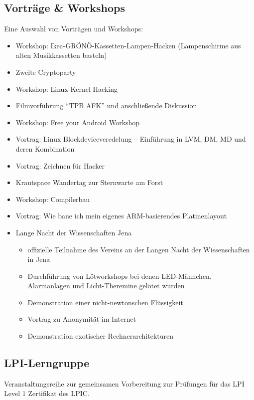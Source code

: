\documentclass[10pt, a4paper]{scrartcl}
\begin{document}
\subsection*{Vorträge \& Workshops}
Eine Auswahl von Vorträgen und Workshops:
\begin{itemize}
	\item Workshop: Ikea-GRÖNÖ-Kassetten-Lampen-Hacken (Lampenschirme aus alten Musikkassetten basteln)
	\item Zweite Cryptoparty
	\item Workshop: Linux-Kernel-Hacking
	\item Filmvorführung "`TPB AFK"' und anschließende Diskussion
	\item Workshop: Free your Android Workshop
	\item Vortrag: Linux Blockdeviceveredelung -- Einführung in LVM, DM, MD und deren Kombination
	\item Vortrag: Zeichnen für Hacker
	\item Krautspace Wandertag zur Sternwarte am Forst
	\item Workshop: Compilerbau
	\item Vortrag: Wie baue ich mein eigenes ARM-basierendes Platinenlayout
	\item Lange Nacht der Wissenschaften Jena
		\begin{itemize}
		    \item offizielle Teilnahme des Vereins an der Langen Nacht der Wissenschaften in Jena
		    \item Durchführung von Lötworkshops bei denen LED-Männchen, Alarmanlagen und Licht-Theremine gelötet wurden
		    \item Demonstration einer nicht-newtonschen Flüssigkeit
		    \item Vortrag zu Anonymität im Internet
		    \item Demonstration exotischer Rechnerarchitekturen
		\end{itemize}
\end{itemize}

\subsection*{LPI-Lerngruppe}
Veranstaltungsreihe zur gemeinsamen Vorbereitung zur Prüfungen für das LPI Level 1 Zertifikat des LPIC. 
\end{document}
